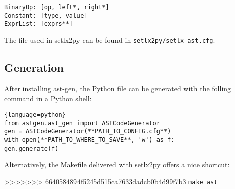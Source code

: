 \begin{verbatim}
BinaryOp: [op, left*, right*]
Constant: [type, value]
ExprList: [exprs**]
\end{verbatim}

The file used in setlx2py can be found in \texttt{setlx2py/setlx_ast.cfg}.

\subsection{Generation}

After installing ast-gen, the Python file can be generated with the folling command in a Python shell:

\begin{lstlisting}{language=python}
from astgen.ast_gen import ASTCodeGenerator
gen = ASTCodeGenerator(**PATH_TO_CONFIG.cfg**)
with open(**PATH_TO_WHERE_TO_SAVE**, 'w') as f:
gen.generate(f)
\end{lstlisting}

Alternatively, the Makefile delivered with setlx2py offers a nice shortcut:

>>>>>>> 6640584894f5245d515ca7633dadcb0b4d99f7b3
\verb$make ast$